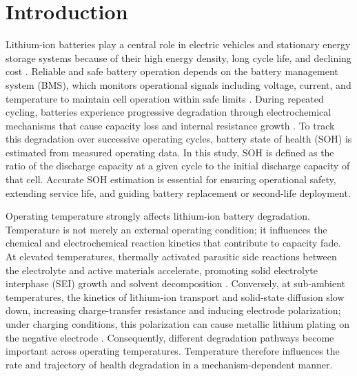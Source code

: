 \documentclass[a4paper,fleqn]{cas-sc}
\begin{document}
\maketitle

\section{Introduction}\label{sec:intro}

Lithium-ion batteries play a central role in electric vehicles and stationary energy storage systems because of their high energy density, long cycle life, and declining cost \citep{ralls2023role}. Reliable and safe battery operation depends on the battery management system (BMS), which monitors operational signals including voltage, current, and temperature to maintain cell operation within safe limits \citep{ali2025comprehensive}. During repeated cycling, batteries experience progressive degradation through electrochemical mechanisms that cause capacity loss and internal resistance growth \citep{li2025deep}. To track this degradation over successive operating cycles, battery state of health (SOH) is estimated from measured operating data. In this study, SOH is defined as the ratio of the discharge capacity at a given cycle to the initial discharge capacity of that cell. Accurate SOH estimation is essential for ensuring operational safety, extending service life, and guiding battery replacement or second-life deployment.

Operating temperature strongly affects lithium-ion battery degradation. Temperature is not merely an external operating condition; it influences the chemical and electrochemical reaction kinetics that contribute to capacity fade. At elevated temperatures, thermally activated parasitic side reactions between the electrolyte and active materials accelerate, promoting solid electrolyte interphase (SEI) growth and solvent decomposition \citep{gao2023effect}. Conversely, at sub-ambient temperatures, the kinetics of lithium-ion transport and solid-state diffusion slow down, increasing charge-transfer resistance and inducing electrode polarization; under charging conditions, this polarization can cause metallic lithium plating on the negative electrode \citep{kumar2024}. Consequently, different degradation pathways become important across operating temperatures. Temperature therefore influences the rate and trajectory of health degradation in a mechanism-dependent manner.
\end{document}
